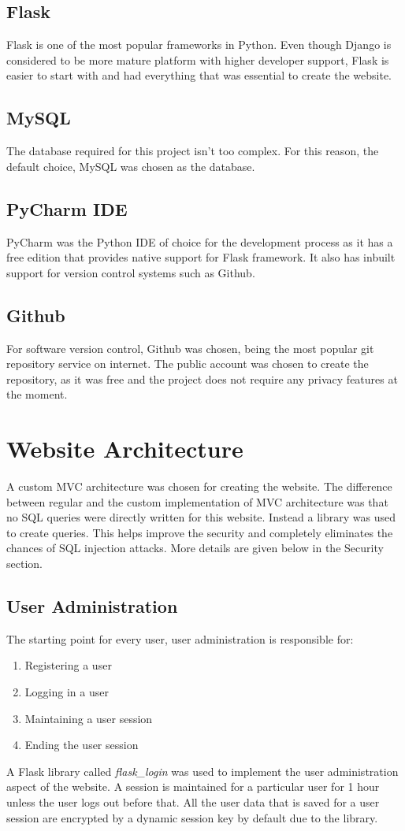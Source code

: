 \subsection{Flask}
Flask is one of the most popular frameworks in Python. Even though Django is considered to be more mature platform with higher developer support, Flask is easier to start with and had everything that was essential to create the website. 

\subsection{MySQL}
The database required for this project isn't too complex. For this reason, the default choice, MySQL was chosen as the database.

\subsection{PyCharm IDE}
PyCharm was the Python IDE of choice for the development process as it has a free edition that provides native support for Flask framework. It also has inbuilt support for version control systems such as Github.

\subsection{Github}
For software version control, Github was chosen, being the most popular git repository service on internet. The public account was chosen to create the repository, as it was free and the project does not require any privacy features at the moment.

\section{Website Architecture}
A custom MVC architecture was chosen for creating the website. The difference between regular and the custom implementation of MVC architecture was that no SQL queries were directly written for this website. Instead a library was used to create queries. This helps improve the security and completely eliminates the chances of SQL injection attacks. More details are given below in the Security section.

\subsection{User Administration}
The starting point for every user, user administration is responsible for:
\begin{enumerate}
    \item Registering a user
    \item Logging in a user
    \item Maintaining a user session
    \item Ending the user session
\end{enumerate}
A Flask library called \textit{flask\_login} was used to implement the user administration aspect of the website. A session is maintained for a particular user for 1 hour unless the user logs out before that. All the user data that is saved for a user session are encrypted by a dynamic session key by default due to the library.

